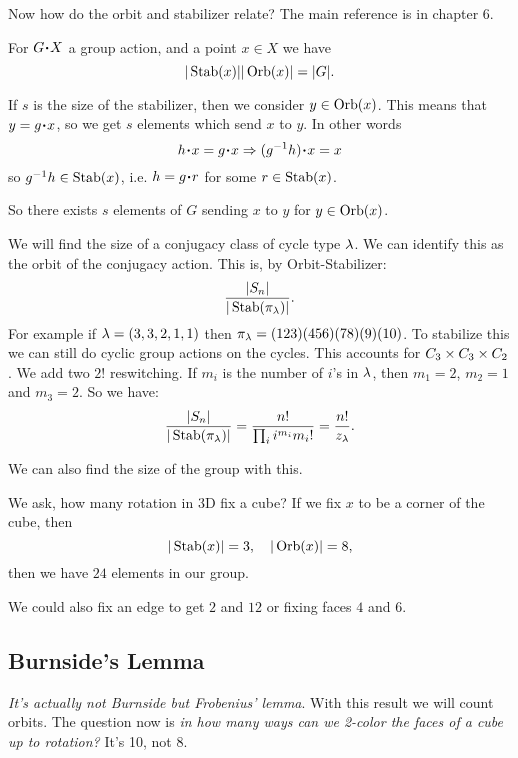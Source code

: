 \documentclass[12pt]{memoir}
\begin{document}
Now how do the orbit and stabilizer relate? The main reference is \cite{Sagan} in chapter 6.

\begin{Th}
    For $G\.X$ a group action, and a point $x\in X$ we have 
    $$|\operatorname{Stab}(x)||\operatorname{Orb}(x)|=|G|.$$
\end{Th}

\begin{ptcbp}
    If $s$ is the size of the stabilizer, then we consider $y\in\operatorname{Orb}(x)$. This means that $y=g\.x$, so we get $s$ elements which send $x$ to $y$. In other words 
    $$h\.x=g\.x\To (g^{-1}h)\.x=x$$
    so $g^{-1}h\in\operatorname{Stab}(x)$, i.e. $h=g\.r$ for some $r\in\operatorname{Stab}(x)$.\par 
    So there exists $s$ elements of $G$ sending $x$ to $y$ for $y\in\operatorname{Orb}(x)$.
\end{ptcbp}

\begin{Ex}
    We will find the size of a conjugacy class of cycle type $\lambda$. We can identify this as the orbit of the conjugacy action. This is, by Orbit-Stabilizer:
    $$\frac{|S_n|}{|\operatorname{Stab}(\pi_\lambda)|}.$$
    For example if $\lambda=(3,3,2,1,1)$ then $\pi_\lambda=(123)(456)(78)(9)(10)$. To stabilize this we can still do cyclic group actions on the cycles. This accounts for $C_3\times C_3\times C_2$. We add two $2!$ reswitching. If $m_i$ is the number of $i$'s in $\lambda$, then $m_1=2$, $m_2=1$ and $m_3=2$. So we have:
    $$\frac{|S_n|}{|\operatorname{Stab}(\pi_\lambda)|}=\frac{n!}{\prod_{i}i^{m_i}m_i!}=\frac{n!}{z_\lambda}.$$
\end{Ex}

We can also find the size of the group with this.

\begin{Ex}
We ask, how many rotation in 3D fix a cube? If we fix $x$ to be a corner of the cube, then 
$$|\operatorname{Stab}(x)|=3,\quad |\operatorname{Orb}(x)|=8,$$
then we have $24$ elements in our group.\par 
We could also fix an edge to get $2$ and $12$ or fixing faces $4$ and $6$.
\end{Ex}

\subsection{Burnside's Lemma}

\emph{It's actually not Burnside but Frobenius' lemma}. With this result we will count orbits.  The question now is \emph{in how many ways can we 2-color the faces of a cube up to rotation?} It's 10, not 8. 
\end{document}

